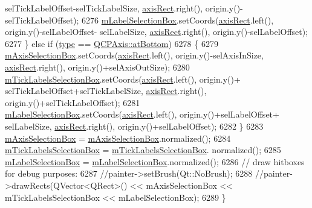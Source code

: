 \begin{DoxyCode}
      selTickLabelOffset-selTickLabelSize, \hyperlink{class_q_c_p_axis_painter_private_afcd55b0e1ecd689fffd2b1fc75dc7732}{axisRect}.right(), origin.y()-selTickLabelOffset);
6276     \hyperlink{class_q_c_p_axis_painter_private_abac9a47048d537f72ca147b6f29d30f1}{mLabelSelectionBox}.setCoords(\hyperlink{class_q_c_p_axis_painter_private_afcd55b0e1ecd689fffd2b1fc75dc7732}{axisRect}.left(), origin.y()-selLabelOffset-
      selLabelSize, \hyperlink{class_q_c_p_axis_painter_private_afcd55b0e1ecd689fffd2b1fc75dc7732}{axisRect}.right(), origin.y()-selLabelOffset);
6277   \} \textcolor{keywordflow}{else} \textcolor{keywordflow}{if} (\hyperlink{class_q_c_p_axis_painter_private_ae04594e97417336933d807c86d353098}{type} == \hyperlink{class_q_c_p_axis_ae2bcc1728b382f10f064612b368bc18aa220d68888516b6c3b493d144f1ba438f}{QCPAxis::atBottom})
6278   \{
6279     \hyperlink{class_q_c_p_axis_painter_private_a9d7586f4923994488bdd006415b13f5f}{mAxisSelectionBox}.setCoords(\hyperlink{class_q_c_p_axis_painter_private_afcd55b0e1ecd689fffd2b1fc75dc7732}{axisRect}.left(), origin.y()-selAxisInSize, 
      \hyperlink{class_q_c_p_axis_painter_private_afcd55b0e1ecd689fffd2b1fc75dc7732}{axisRect}.right(), origin.y()+selAxisOutSize);
6280     \hyperlink{class_q_c_p_axis_painter_private_a0adaf5f1d89be0f32dc4a904d157e5a9}{mTickLabelsSelectionBox}.setCoords(\hyperlink{class_q_c_p_axis_painter_private_afcd55b0e1ecd689fffd2b1fc75dc7732}{axisRect}.left(), origin.y()+
      selTickLabelOffset+selTickLabelSize, \hyperlink{class_q_c_p_axis_painter_private_afcd55b0e1ecd689fffd2b1fc75dc7732}{axisRect}.right(), origin.y()+selTickLabelOffset);
6281     \hyperlink{class_q_c_p_axis_painter_private_abac9a47048d537f72ca147b6f29d30f1}{mLabelSelectionBox}.setCoords(\hyperlink{class_q_c_p_axis_painter_private_afcd55b0e1ecd689fffd2b1fc75dc7732}{axisRect}.left(), origin.y()+selLabelOffset+
      selLabelSize, \hyperlink{class_q_c_p_axis_painter_private_afcd55b0e1ecd689fffd2b1fc75dc7732}{axisRect}.right(), origin.y()+selLabelOffset);
6282   \}
6283   \hyperlink{class_q_c_p_axis_painter_private_a9d7586f4923994488bdd006415b13f5f}{mAxisSelectionBox} = \hyperlink{class_q_c_p_axis_painter_private_a9d7586f4923994488bdd006415b13f5f}{mAxisSelectionBox}.normalized();
6284   \hyperlink{class_q_c_p_axis_painter_private_a0adaf5f1d89be0f32dc4a904d157e5a9}{mTickLabelsSelectionBox} = \hyperlink{class_q_c_p_axis_painter_private_a0adaf5f1d89be0f32dc4a904d157e5a9}{mTickLabelsSelectionBox}.
      normalized();
6285   \hyperlink{class_q_c_p_axis_painter_private_abac9a47048d537f72ca147b6f29d30f1}{mLabelSelectionBox} = \hyperlink{class_q_c_p_axis_painter_private_abac9a47048d537f72ca147b6f29d30f1}{mLabelSelectionBox}.normalized();
6286   \textcolor{comment}{// draw hitboxes for debug purposes:}
6287   \textcolor{comment}{//painter->setBrush(Qt::NoBrush);}
6288   \textcolor{comment}{//painter->drawRects(QVector<QRect>() << mAxisSelectionBox << mTickLabelsSelectionBox <<
       mLabelSelectionBox);}
6289 \}
\end{DoxyCode}


